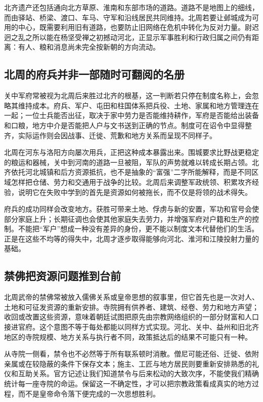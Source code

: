 北齐遗产还包括通向北方草原、淮南和东部市场的道路。道路不是地图上的细线，而由驿站、桥梁、渡口、车马、守军和沿线居民共同维持。北周若要让邺城成为可用的中心，既需要利用旧有道路，也要防止旧网络在危机中转化为反对力量。尉迟迥之乱之所以能在杨坚受禅之初撼动河北，正显示军事胜利和行政归属之间仍有距离：有人、粮和消息尚未完全按新朝的方向流动。

\subsection{北周的府兵并非一部随时可翻阅的名册}

关中军府常被视为北周后来胜过北齐的根基，这一判断若只停在制度名称上，会忽略其维持成本。府兵、军户、屯田和柱国体系把兵役、土地、家属和地方管理连在一起；一位士兵能否出征，取决于家中劳力是否能维持耕作，军府是否能给出装备和口粮，地方中介是否能把人户与文书送到正确的节点。制度可在诏令中显得整齐，实际运作则会因战事、迁徙、荒歉和地方关系而呈现不同样子。

北周在河东与洛阳方向屡次用兵，正把这种成本暴露出来。围城要求比野战更稳定的粮运和器械，关中到河南的道路一旦被阻，军队的声势就难以转成长期占领。北齐依托河北城镇和后方资源抵抗，也不是抽象的“富强”二字所能解释，而是不同区域怎样把仓储、劳力和交通用于战争的比较。北周后来调整军政统领、积累攻齐经验，说明它在失败中学到的首先是资源如何被拖长，而不仅是将领的战术得失。

府兵的成功同样会改变地方。获胜可带来土地、俘虏与新的安置，军功和官号会使部分家庭上升；长期征调也会使其他家庭失去劳力，并增强军府对户籍和生产的控制。不能把“军户”想成一种没有差异的身份，更不能以制度文本代替他们的生活。正是在这些不均等的得失中，北周才逐步取得能够向河北、淮河和江陵投射力量的基础。

\subsection{禁佛把资源问题推到台前}

北周武帝的禁佛常被放入儒佛关系或皇帝思想的叙事里，但它首先也是一次对人、土地和可征发资源的重新安排。寺院拥有供养者、建筑、经卷、劳力和地方声望；收回或改置这些资源，意味着朝廷试图把原先由宗教网络组织的一部分财富和人口接进官府。这个意图不等于每处都能以同样方式实现。河北、关中、益州和旧北齐地区的寺院规模、地方关系与执行者不同，政策抵达后的结果不可能只有一种。

从寺院一侧看，禁令也不必然等于所有联系顿时消散。僧尼可能还俗、迁徙、依附亲属或在较隐蔽的条件下保存文本；施主、工匠与地方居民则要重新安排熟悉的礼仪和互助关系。官方记述让我们知道禁令与后来松动的大致次序，不能使我们精确统计每一座寺院的命运。保留这一不确定性，才可以把宗教政策看成真实的地方过程，而不是皇帝命令落下便完成的一次思想胜利。

